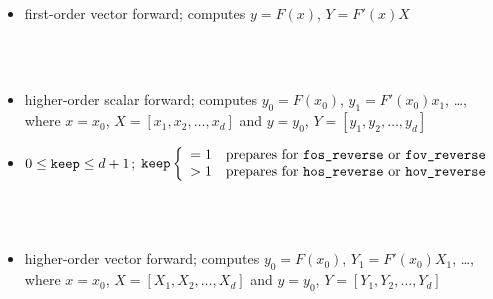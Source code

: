 \documentclass[12pt,oneside,a4paper]{article}
\begin{document}
\begin{center}
{{\begin{center}
\end{center}}}\\[2ex]
\begin{minipage}[h]{14cm}
\small 
\begin{itemize}
\item first-order vector forward; computes $y=F\left(x\right)$,
      $Y=F'\left(x\right)X$
\end{itemize}
\end{minipage}\\[2ex]
%
\\[2ex]
\begin{minipage}[h]{14cm}
\small 
\begin{itemize}
\item higher-order scalar forward; computes $y_0=F\left(x_0\right)$,
      $y_1=F'\left(x_0\right)x_1$, \ldots, where $x=x_0$,
      $X=[x_1,x_2,\ldots,x_d]$ and  $y=y_0$,
      $Y=[y_1,y_2,\ldots,y_d]$ 
\item $0\leq\text{\tt keep}\leq d+1$; 
      $\text{\tt keep} \left\{\begin{array}{cl}
       = 1  & \text{prepares for {\tt fos\_reverse} or {\tt fov\_reverse}} \\
       > 1 & \text{prepares for {\tt hos\_reverse} or {\tt hov\_reverse}}
       \end{array}\right.$ 
\end{itemize}
\end{minipage}\\[2ex]
%
\\[2ex]
\begin{minipage}[h]{14cm}
\small 
\begin{itemize}
\item higher-order vector forward; computes $y_0=F\left(x_0\right)$,
      $Y_1=F'\left(x_0\right)X_1$, \ldots, where $x=x_0$,
      $X=[X_1,X_2,\ldots,X_d]$ and  $y=y_0$,
      $Y=[Y_1,Y_2,\ldots,Y_d]$ 
\end{itemize}
\end{minipage}\\[2ex]
\end{center}
\end{document}

